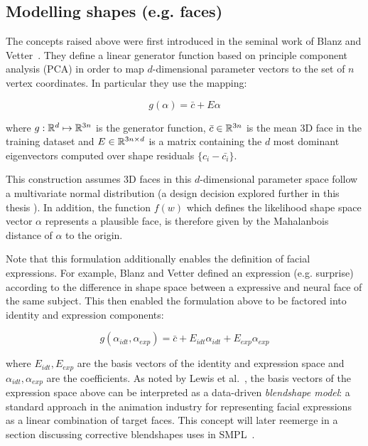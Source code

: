 \subsection{Modelling shapes (e.g. faces)}

The concepts raised above were first introduced in the seminal work of Blanz and Vetter~\cite{blanz-vetter}. They define a linear generator function based on principle component analysis (PCA) in order to map $d$-dimensional parameter vectors to the set of $n$ vertex coordinates. In particular they use the mapping:

\begin{equation}
    g(\alpha) = \bar{c} + E\alpha
\end{equation}

where $g: {\mathbb{R}^{d}} \mapsto {\mathbb{R}^{3n}}$ is the generator function, $\bar{c} \in {\mathbb{R}^{3n}}$ is the mean 3D face in the training dataset and $E \in {\mathbb{R}^{3n \times d}}$ is a matrix containing the $d$ most dominant eigenvectors computed over shape residuals $\{c_i - \bar{c_i}\}$. 

This construction assumes 3D faces in this $d$-dimensional parameter space follow a multivariate normal distribution (a design decision explored further in this thesis ). In addition, the function $f(w)$ which defines the likelihood shape space vector $\alpha$ represents a plausible face, is therefore given by the Mahalanbois distance of $\alpha$ to the origin. 

Note that this formulation additionally enables the definition of facial expressions. For example, Blanz and Vetter defined an expression (e.g. surprise) according to the difference in shape space between a expressive and neural face of the same subject. This then enabled the formulation above to be factored into identity and expression components:

\begin{equation}
    g(\alpha_{idt}, \alpha_{exp}) = \bar{c} + E_{idt}\alpha_{idt} + E_{exp}\alpha_{exp}
\end{equation}

where $E_{idt}, E_{exp}$ are the basis vectors of the identity and expression space and $\alpha_{idt}, \alpha_{exp}$ are the coefficients. As noted by Lewis et al.~\cite{xxx}, the basis vectors of the expression space above can be interpreted as a data-driven \emph{blendshape model}: a standard approach in the animation industry for representing facial expressions as a linear combination of target faces. This concept will later reemerge in a section discussing corrective blendshapes uses in SMPL~\cite{loper15smpl}.

